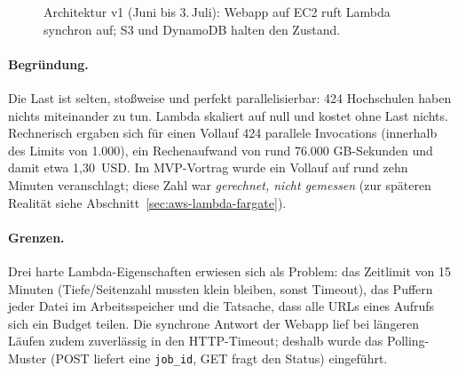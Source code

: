 \begin{figure}\centering
  \resizebox{0.95\linewidth}{!}{\archA}
  \caption{Architektur v1 (Juni bis 3.\,Juli): Webapp auf EC2 ruft Lambda synchron auf; S3 und DynamoDB halten den Zustand.}\label{fig:archA}
\end{figure}

\paragraph{Begründung.} Die Last ist selten, stoßweise und perfekt parallelisierbar: 424 Hochschulen haben nichts miteinander zu tun. Lambda skaliert auf null und kostet ohne Last nichts. Rechnerisch ergaben sich für einen Vollauf 424 parallele Invocations (innerhalb des Limits von 1.000), ein Rechenaufwand von rund 76.000 GB-Sekunden und damit etwa 1,30~USD. Im MVP-Vortrag wurde ein Vollauf auf rund zehn Minuten veranschlagt; diese Zahl war \emph{gerechnet, nicht gemessen} (zur späteren Realität siehe Abschnitt~\ref{sec:aws-lambda-fargate}).

\paragraph{Grenzen.} Drei harte Lambda-Eigenschaften erwiesen sich als Problem: das Zeitlimit von 15 Minuten (Tiefe/Seitenzahl mussten klein bleiben, sonst Timeout), das Puffern jeder Datei im Arbeitsspeicher und die Tatsache, dass alle URLs eines Aufrufs sich ein Budget teilen. Die synchrone Antwort der Webapp lief bei längeren Läufen zudem zuverlässig in den HTTP-Timeout; deshalb wurde das Polling-Muster (POST liefert eine \texttt{job\_id}, GET fragt den Status) eingeführt.


